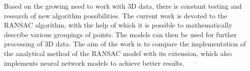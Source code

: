 Based on the growing need to work with 3D data, there is constant testing and research of new algorithm possibilities. The current work is devoted to the RANSAC algorithm, with the help of which it is possible to mathematically describe various groupings of points. The models can then be used for further processing of 3D data. The aim of the work is to compare the implementation of the analytical method of the RANSAC model with its extension, which also implements neural network models to achieve better results.